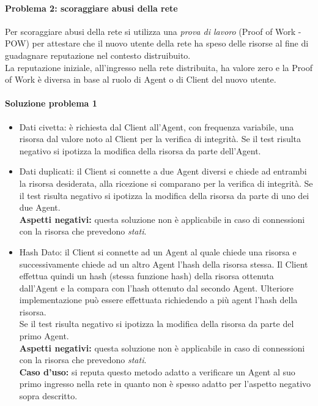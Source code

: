 \documentclass[]{article}
\begin{document}
		\paragraph{Problema 2: scoraggiare abusi della rete}
			Per scoraggiare abusi della rete si utilizza una \textit{prova di lavoro} (Proof of Work - POW) per attestare che il nuovo utente della rete ha speso delle risorse al fine di guadagnare reputazione nel contesto distruibuito.\\
			La reputazione iniziale, all'ingresso nella rete distribuita, ha valore zero e la Proof of Work è diversa in base al ruolo di Agent o di Client del nuovo utente.
			
		\paragraph{Soluzione problema 1}
			\begin{itemize}
				\item Dati civetta: è richiesta dal Client all'Agent, con frequenza variabile, una risorsa dal valore noto al Client per la verifica di integrità. Se il test risulta negativo si ipotizza la modifica della risorsa da parte dell'Agent.
				\item Dati duplicati: il Client si connette a due Agent diversi e chiede ad entrambi la risorsa desiderata, alla ricezione si comparano per la verifica di integrità. Se il test risulta negativo si ipotizza la modifica della risorsa da parte di uno dei due Agent.\\
				\textbf{Aspetti negativi:} questa soluzione non è applicabile in caso di connessioni con la risorsa che prevedono \textit{stati}.
				\item Hash Dato: il Client si connette ad un Agent al quale chiede una risorsa e successivamente chiede ad un altro Agent l'hash della risorsa stessa. Il Client effettua quindi un hash (stessa funzione hash) della risorsa ottenuta dall'Agent e la compara con l'hash ottenuto dal secondo Agent. Ulteriore implementazione può essere effettuata richiedendo a più agent l'hash della risorsa.\\
				Se il test risulta negativo si ipotizza la modifica della risorsa da parte del primo Agent.\\
				\textbf{Aspetti negativi:} questa soluzione non è applicabile in caso di connessioni con la risorsa che prevedono \textit{stati}.\\
				\textbf{Caso d'uso:} si reputa questo metodo adatto a verificare un Agent al suo primo ingresso nella rete in quanto non è spesso adatto per l'aspetto negativo sopra descritto.		
			\end{itemize}
			
\end{document}
